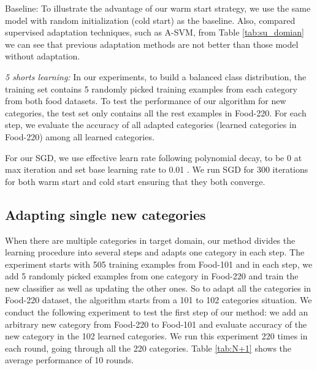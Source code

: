 Baseline: To illustrate the advantage of our warm start strategy, we use the same model with random initialization (cold start) as the baseline.
Also, compared supervised adaptation techniques, such as A-SVM, from Table \ref{tab:su_domian} we can see that previous adaptation methods are not better than those model without adaptation.%

\emph{5 shorts learning:} In our experiments, to build a balanced class distribution, the training set contains 5 randomly picked training examples from each category from both food datasets. To test the performance of our algorithm for new categories, the test set only contains all the rest examples in Food-220. For each step, we evaluate the accuracy of all adapted categories (learned categories in Food-220) among all learned categories.

For our SGD, we use effective learn rate following polynomial decay, to be 0 at max iteration and set base learning rate to 0.01 \cite{jia2014caffe}. We run SGD for 300 iterations for both warm start and cold start ensuring that they both converge.

\subsection{Adapting single new categories}
When there are multiple categories in target domain, our method divides the learning procedure into several steps and adapts one category in each step. The experiment starts with 505 training examples from Food-101 and in each step, we add 5 randomly picked examples from one category in Food-220 and train the new classifier as well as updating the other ones. So to adapt all the categories in Food-220 dataset, the algorithm starts from a 101 to 102 categories situation. We conduct the following experiment to test the first step of our method: we add an arbitrary new category from Food-220 to Food-101 and evaluate accuracy of the new category in the 102 learned categories. We run this experiment 220 times in each round, going through all the 220 categories. Table \ref{tab:N+1} shows the average performance of 10 rounds.

